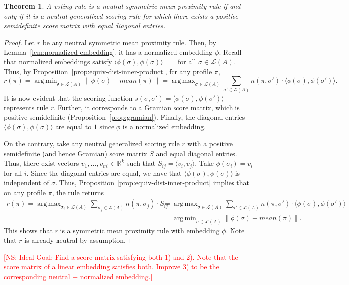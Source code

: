 \documentclass[10pt,letterpaper]{article}
\newcommand{\calL}{{\mathcal{L}}}
\newcommand{\rank}{{\calL(A)}}
\DeclareMathOperator*{\argmax}{arg\,max}
\DeclareMathOperator*{\argmin}{arg\,min}
\newtheorem{theorem}{Theorem}
\newcommand{\kibitz}[2]{\ifnum\Comments=1\textcolor{#1}{#2}\fi}
\newcommand{\cns}[1]{\kibitz{red} {[NS: #1]}}
\begin{document}


\begin{theorem}
A voting rule is a neutral symmetric mean proximity rule if and only if it is a neutral generalized scoring rule for which there exists a positive semidefinite score matrix with equal diagonal entries. 
\label{thm:psd}
\end{theorem}
\begin{proof}
Let $r$ be any neutral symmetric mean proximity rule. Then, by Lemma~\ref{lem:normalized-embedding}, it has a normalized embedding $\phi$. Recall that normalized embeddings satisfy $\langle \phi(\sigma),\phi(\sigma) \rangle = 1$ for all $\sigma \in \rank$. Thus, by Proposition~\ref{prop:equiv-dist-inner-product}, for any profile $\pi$,
$$
r(\pi) = \argmin_{\sigma \in \rank} \|\phi(\sigma)-mean(\pi)\| = \argmax_{\sigma \in \rank} \sum_{\sigma' \in \rank} n(\pi,\sigma') \cdot \langle \phi(\sigma),\phi(\sigma') \rangle.
$$
It is now evident that the scoring function $s(\sigma,\sigma') = \langle \phi(\sigma),\phi(\sigma') \rangle$ represents rule $r$. Further, it corresponds to a Gramian score matrix, which is positive semidefinite (Proposition~\ref{prop:gramian}). Finally, the diagonal entries $\langle \phi(\sigma),\phi(\sigma) \rangle$ are equal to $1$ since $\phi$ is a normalized embedding.

On the contrary, take any neutral generalized scoring rule $r$ with a positive semidefinite (and hence Gramian) score matrix $S$ and equal diagonal entries. Thus, there exist vectors $v_1,\ldots,v_{m!} \in \mathbb{R}^k$ such that $S_{ij} = \langle v_i,v_j \rangle$. Take $\phi(\sigma_i) = v_i$ for all $i$. Since the diagonal entries are equal, we have that $\langle \phi(\sigma),\phi(\sigma) \rangle$ is independent of $\sigma$. Thus, Proposition~\ref{prop:equiv-dist-inner-product} implies that on any profile $\pi$, the rule returns 
\begin{align*}
r(\pi) = \argmax_{\sigma_i \in \rank} \sum_{\sigma_j \in \rank} n(\pi,\sigma_j) \cdot S_{ij} &= \argmax_{\sigma \in \rank} \sum_{\sigma' \in \rank} n(\pi,\sigma') \cdot \langle \phi(\sigma),\phi(\sigma') \rangle \\
&= \argmin_{\sigma \in \rank} \|\phi(\sigma)-mean(\pi)\|.
\end{align*}
This shows that $r$ is a symmetric mean proximity rule with embedding $\phi$. Note that $r$ is already neutral by assumption. 
\end{proof}

\cns{Ideal Goal: Find a score matrix satisfying both 1) and 2). Note that the score matrix of a linear embedding satisfies both. Improve 3) to be the corresponding neutral + normalized embedding.}
\end{document}
